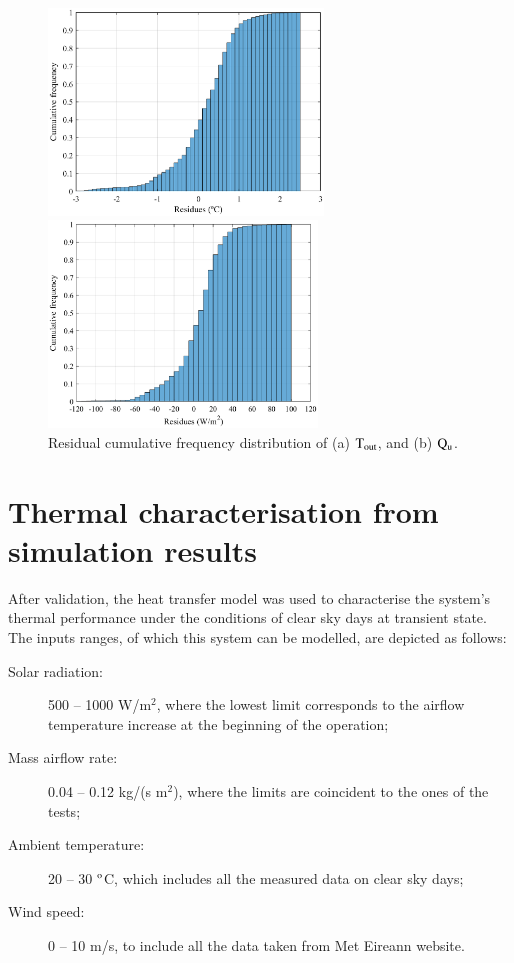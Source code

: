\begin{figure}[ht!]
	\begin{minipage}{0.49\columnwidth}
		\includegraphics[width=0.95\columnwidth,height=5.5cm]{figs/cdf_T.eps}
	\end{minipage}
	\begin{minipage}{0.49\columnwidth}
		\includegraphics[width=1.0\columnwidth,height=5.5cm]{figs/cdf_Q.eps}
	\end{minipage}
	\caption{Residual cumulative frequency distribution of (a) $\rm{T_{out}}$, and (b) $\rm{Q_u}$.}
	\label{cdf}
\end{figure}


\section{Thermal characterisation from simulation results}

After validation, the heat transfer model was used to characterise the system's thermal performance under the conditions of clear sky days at transient state. The inputs ranges, of which this system can be modelled, are depicted as follows:

\begin{description}
	\item[Solar radiation:] 500 -- 1000 W/m$^2$, where the lowest limit corresponds to the airflow temperature increase at the beginning of the operation;
	\item[Mass airflow rate:] 0.04 -- 0.12 kg/(s m$^2$), where the limits are coincident to the ones of the tests;
	\item[Ambient temperature:] 20 -- 30 $^{\rm{o}}$C, which includes all the measured data on clear sky days;
	\item[Wind speed:] 0 -- 10 m/s, to include all the data taken from Met Eireann website.
\end{description}

